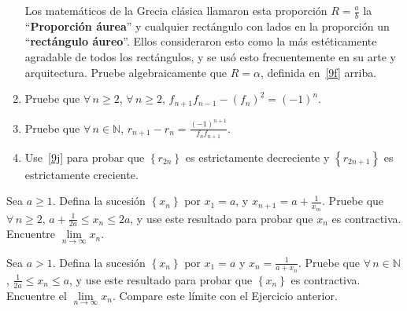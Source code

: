 \begin{prob}
\begin{enumerate}
	Los matemáticos de la Grecia clásica llamaron esta proporción $R=\frac{a}{b}$ la ``\textbf{Proporción áurea}'' y cualquier rectángulo con lados en la proporción un ``\textbf{rectángulo áureo}''. Ellos consideraron esto como la más estéticamente agradable de todos los rectángulos, y se usó esto frecuentemente en su arte y arquitectura. Pruebe algebraicamente que $R=\alpha$, definida en~\ref{9f} arriba.
	\item Pruebe que $\forall\,n\geq2$, $\forall\,n\geq2$, $f_{n+1}f_{n-1}-{\left(f_{n}\right)}^{2}={\left(-1\right)}^{n}$.
	\item Pruebe que $\forall\,n\in\mathbb{N}$, $r_{n+1}-r_{n}=\frac{{\left(-1\right)}^{n+1}}{f_{n}f_{n+1}}$.\label{9j}
	\item Use~\ref{9j} para probar que $\left\{r_{2n}\right\}$ es estrictamente decreciente y $\left\{r_{2n+1}\right\}$ es estrictamente creciente.
\end{enumerate}
\end{prob}

\begin{prob}
Sea $a\geq1$. Defina la sucesión $\left\{x_{n}\right\}$ por $x_{1}=a$, y $x_{n+1}=a+\frac{1}{x_{m}}$. Pruebe que $\forall\,n\geq2$, $a+\frac{1}{2a}\leq x_{n}\leq 2a$, y use este resultado para probar que $x_{n}$ es contractiva. Encuentre $\lim\limits_{n\to\infty}x_{n}$.
\end{prob}

\begin{prob}
Sea $a>1$. Defina la sucesión $\left\{x_{n}\right\}$ por $x_{1}=a$ y $x_{n}=\frac{1}{a+x_{n}}$. Pruebe que $\forall\,n\in\mathbb{N}$, $\frac{1}{2a}\leq x_{n}\leq a$, y use este resultado para probar que $\left\{x_{n}\right\}$ es contractiva. Encuentre el $\lim\limits_{n\to\infty}x_{n}$. Compare este límite con el Ejercicio anterior.
\end{prob}